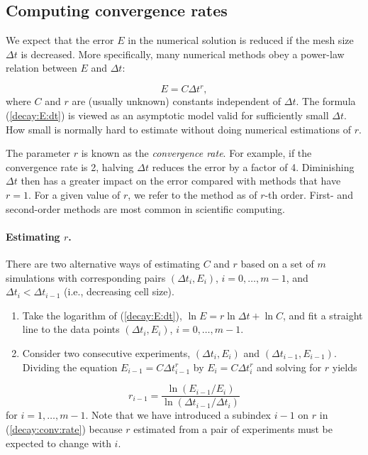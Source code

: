 \documentclass[graybox,sectrefs,envcountresetchap,open=right,final]{svmonodo}
\begin{document}
\subsection{Computing convergence rates}
\label{decay:convergence:rate}


We expect that the error $E$ in the numerical solution is
reduced if the mesh size $\Delta t$ is decreased. More specifically,
many numerical methods obey a power-law relation between $E$ and
$\Delta t$:

\begin{equation}
E = C\Delta t^r,
\label{decay:E:dt}
\end{equation}
where $C$ and $r$ are (usually unknown) constants independent of $\Delta t$.
The formula (\ref{decay:E:dt}) is viewed as an asymptotic model valid for
sufficiently small $\Delta t$. How small is normally hard to estimate
without doing numerical estimations of $r$.

The parameter $r$ is known as the \emph{convergence rate}. For example,
if the convergence rate is 2, halving $\Delta t$ reduces the error by
a factor of 4. Diminishing $\Delta t$ then has a greater impact on
the error compared with methods that have $r=1$. For a given value of $r$,
we refer to the method as of $r$-th order. First- and second-order
methods are most common in scientific computing.

\paragraph{Estimating $r$.}
There are two alternative ways of estimating $C$ and $r$ based on a set of
$m$ simulations with corresponding pairs $(\Delta t_i, E_i)$, $i=0,\ldots,m-1$,
and $\Delta t_{i} < \Delta t_{i-1}$ (i.e., decreasing cell size).

\begin{enumerate}
 \item Take the logarithm of (\ref{decay:E:dt}), $\ln E = r\ln \Delta t + \ln C$,
    and fit a straight line to the data points $(\Delta t_i, E_i)$,
    $i=0,\ldots,m-1$.

 \item Consider two consecutive experiments, $(\Delta t_i, E_i)$ and
    $(\Delta t_{i-1}, E_{i-1})$. Dividing the equation
    $E_{i-1}=C\Delta t_{i-1}^r$ by $E_{i}=C\Delta t_{i}^r$ and solving
    for $r$ yields
\end{enumerate}

\noindent
\begin{equation}
r_{i-1} = \frac{\ln (E_{i-1}/E_i)}{\ln (\Delta t_{i-1}/\Delta t_i)}
\label{decay:conv:rate}
\end{equation}
for $i=1,\ldots,m-1$. Note that we have introduced a subindex $i-1$
on $r$ in (\ref{decay:conv:rate}) because $r$ estimated from
a pair of experiments must be expected to change with $i$.
\end{document}
